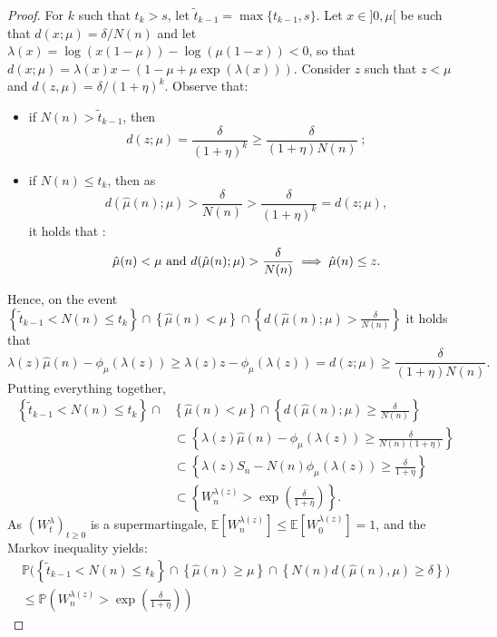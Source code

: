 \documentclass[wcp]{jmlr}
\newcommand{\E}{\mathbb{E}}
\renewcommand{\P}{\mathbb{P}}
\newcommand{\1}{\mathbbm{1}}
\begin{document}
{\begin{proof}
  For $k$ such that $t_k>s$, let $\tilde{t}_{k-1} = \max\{t_{k-1}, s\}$.
  Let $x \in ]0, \mu[$ be such that $d(x;\mu)=\delta/N(n)$ and let
  $\lambda(x)=\log(x\left( 1-\mu \right))-\log (\mu\left( 1-x \right))<0$, so
  that $d(x; \mu) =  \lambda(x)x- \left( 1-\mu+\mu \exp\left( \lambda(x) \right) \right).$ Consider $z$ such that $z <
  \mu$ and $d(z, \mu)=\delta/(1+\eta)^{k}$. Observe that:
  \begin{itemize}
  \item if $N(n)>\tilde{t}_{k-1}$, then $$d(z; \mu) =
    \frac{\delta}{(1+\eta)^{k}} \geq \frac{\delta}{(1+\eta)N(n)}\;;$$
  \item if $N(n)\leq t_k$, then as
 $$d(\hat{\mu}(n); \mu)>\frac{\delta}{N(n)}>\frac{\delta}{(1+\eta)^k} = d(z; \mu),$$
it holds that :
  \[\hat{\mu}(n) < \mu \hbox{ and } d(\hat{\mu}(n); \mu)>\frac{\delta}{N(n)}\implies \hat{\mu}(n)\leq z.\]
\end{itemize}
Hence, on the event $\left\{\tilde{t}_{k-1}<N(n)\leq t_k\right\} \cap
\left\{\hat{\mu}(n) < \mu\right\} \cap \left\{d(\hat{\mu}(n);
  \mu)>\frac{\delta}{N(n)}\right\}$ it holds that
$$\lambda(z) \hat{\mu}(n) - \phi_\mu(\lambda(z)) \geq 
\lambda(z) z - \phi_\mu(\lambda(z)) = d(z; \mu)
\geq\frac{\delta}{(1+\eta)N(n)}.$$ Putting everything together,
\begin{align*}
  \left\{ \tilde{t}_{k-1}<N(n)\leq t_k \right\}\cap&\left\{ \hat{\mu}(n) < \mu  \right\} \cap\left\{d(\hat{\mu}(n); \mu) \geq \frac{\delta}{N(n)} \right\}\\
 & \subset \left\{ \lambda(z) \hat{\mu}(n) - \phi_\mu(\lambda(z)) \geq  \frac{\delta}{N(n)\left( 1+\eta \right)}  \right\}\\
   &\subset \left\{  \lambda(z)S_n - N(n) \phi_\mu(\lambda(z)) \geq \frac{\delta}{1+\eta} \right\} \\
   &\subset \left\{ W^{\lambda(z)}_n > \exp
    \left(\frac{\delta}{1+\eta}\right)\right\}.
\end{align*}
As $\left(W^{\lambda}_t\right)_{t\geq0}$ is a supermartingale,
$\E\left[W^{\lambda(z)}_n\right] \leq \E\left[W^{\lambda(z)}_0\right] =1$, and
the Markov inequality yields:
\begin{multline*}
  \P\Big(\left\{\tilde{t}_{k-1}<N(n)\leq t_k\right\}\cap \left\{
      \hat{\mu}(n)\geq \mu \right\} \cap \left\{N(n)d(\hat{\mu}(n), \mu)\geq
      \delta \right\} \Big) \\\leq
  \P\left(W^{\lambda(z)}_n > \exp\left(\frac{\delta}{1+\eta}\right) \right) \label{eq:umarkov} 

\end{multline*}
\end{proof}}
\end{document}
